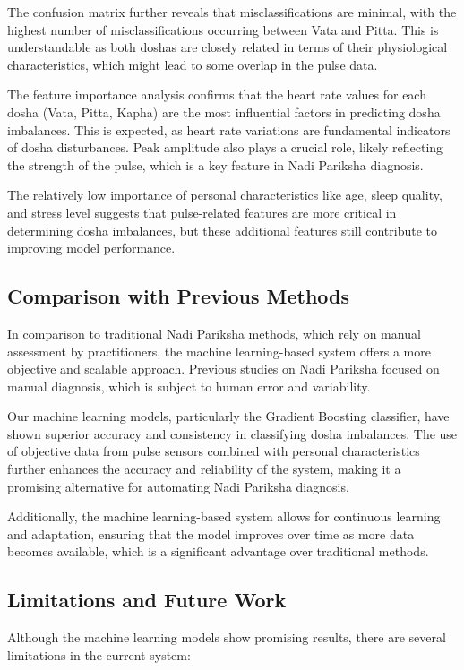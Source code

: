 \documentclass[10pt,twocolumn]{article}
\begin{document}
The confusion matrix further reveals that misclassifications are minimal, with the highest number of misclassifications occurring between Vata and Pitta. This is understandable as both doshas are closely related in terms of their physiological characteristics, which might lead to some overlap in the pulse data.

The feature importance analysis confirms that the heart rate values for each dosha (Vata, Pitta, Kapha) are the most influential factors in predicting dosha imbalances. This is expected, as heart rate variations are fundamental indicators of dosha disturbances. Peak amplitude also plays a crucial role, likely reflecting the strength of the pulse, which is a key feature in Nadi Pariksha diagnosis.

The relatively low importance of personal characteristics like age, sleep quality, and stress level suggests that pulse-related features are more critical in determining dosha imbalances, but these additional features still contribute to improving model performance.
\subsection{Comparison with Previous Methods}

In comparison to traditional Nadi Pariksha methods, which rely on manual assessment by practitioners, the machine learning-based system offers a more objective and scalable approach. Previous studies on Nadi Pariksha focused on manual diagnosis, which is subject to human error and variability.

Our machine learning models, particularly the Gradient Boosting classifier, have shown superior accuracy and consistency in classifying dosha imbalances. The use of objective data from pulse sensors combined with personal characteristics further enhances the accuracy and reliability of the system, making it a promising alternative for automating Nadi Pariksha diagnosis.

Additionally, the machine learning-based system allows for continuous learning and adaptation, ensuring that the model improves over time as more data becomes available, which is a significant advantage over traditional methods.

\subsection{Limitations and Future Work}

Although the machine learning models show promising results, there are several limitations in the current system:
\end{document}
